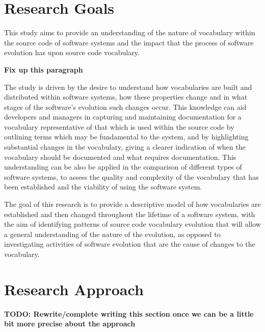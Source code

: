 \section{Research Goals} %
\label{sec:research_goals}

This study aims to provide an understanding of the nature of vocabulary within the source code of software systems and the impact that the process of software evolution has upon source code vocabulary.


\textbf{Fix up this paragraph}

The study is driven by the desire to understand how vocabularies are built and distributed within software systems, how these properties change and in what stages of the software's evolution such changes occur. This knowledge can aid developers and managers in capturing and maintaining documentation for a vocabulary representative of that which is used within the source code by outlining terms which may be fundamental to the system, and by highlighting substantial changes in the vocabulary, giving a clearer indication of when the vocabulary should be documented and what requires documentation. This understanding can be also be applied in the comparison of different types of software systems, to assess the quality and complexity of the vocabulary that has been established and the viability of using the software system.

The goal of this research is to provide a descriptive model of how vocabularies are established and then changed throughout the lifetime of a software system, with the aim of identifying patterns of source code vocabulary evolution that will allow a general understanding of the nature of the evolution, as opposed to investigating activities of software evolution that are the cause of changes to the vocabulary.


\section{Research Approach} %
\label{sec:research_approach}

\textbf{TODO: Rewrite/complete writing this section once we can be a little bit more precise about the approach}


